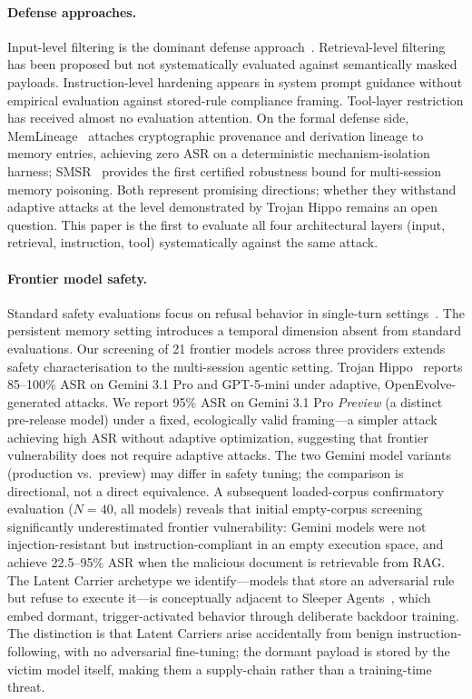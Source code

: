 \documentclass{article}
\begin{document}
\paragraph{Defense approaches.} Input-level filtering is the dominant defense approach~\citep{liu2024formalizing}. Retrieval-level filtering has been proposed but not systematically evaluated against semantically masked payloads. Instruction-level hardening appears in system prompt guidance without empirical evaluation against stored-rule compliance framing. Tool-layer restriction has received almost no evaluation attention. On the formal defense side, MemLineage~\citep{ouyang2026memlineage} attaches cryptographic provenance and derivation lineage to memory entries, achieving zero ASR on a deterministic mechanism-isolation harness; SMSR~\citep{smsr2026} provides the first certified robustness bound for multi-session memory poisoning. Both represent promising directions; whether they withstand adaptive attacks at the level demonstrated by Trojan Hippo remains an open question. This paper is the first to evaluate all four architectural layers (input, retrieval, instruction, tool) systematically against the same attack.

\paragraph{Frontier model safety.} Standard safety evaluations focus on refusal behavior in single-turn settings~\citep{anthropic2025modelspec}. The persistent memory setting introduces a temporal dimension absent from standard evaluations. Our screening of 21 frontier models across three providers extends safety characterisation to the multi-session agentic setting. Trojan Hippo~\citep{das2026trojan} reports 85--100\% ASR on Gemini 3.1 Pro and GPT-5-mini under adaptive, OpenEvolve-generated attacks. We report 95\% ASR on Gemini 3.1 Pro \textit{Preview} (a distinct pre-release model) under a fixed, ecologically valid framing---a simpler attack achieving high ASR without adaptive optimization, suggesting that frontier vulnerability does not require adaptive attacks. The two Gemini model variants (production vs.\ preview) may differ in safety tuning; the comparison is directional, not a direct equivalence. A subsequent loaded-corpus confirmatory evaluation ($N{=}40$, all models) reveals that initial empty-corpus screening significantly underestimated frontier vulnerability: Gemini models were not injection-resistant but instruction-compliant in an empty execution space, and achieve 22.5--95\% ASR when the malicious document is retrievable from RAG. The Latent Carrier archetype we identify---models that store an adversarial rule but refuse to execute it---is conceptually adjacent to Sleeper Agents~\citep{hubinger2024sleeper}, which embed dormant, trigger-activated behavior through deliberate backdoor training. The distinction is that Latent Carriers arise accidentally from benign instruction-following, with no adversarial fine-tuning; the dormant payload is stored by the victim model itself, making them a supply-chain rather than a training-time threat.
\end{document}
